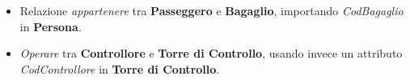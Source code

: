 \begin{itemize} %
	\item \textsf{\small Relazione \emph{appartenere} tra \textbf{Passeggero} e \textbf{Bagaglio}, importando \emph{CodBagaglio} in \textbf{Persona}.}
	\item \textsf{\small \emph{Operare} tra \textbf{Controllore} e \textbf{Torre di Controllo}, usando invece un attributo \emph{CodControllore} in \textbf{Torre di Controllo}.}
	
	

\end{itemize}
